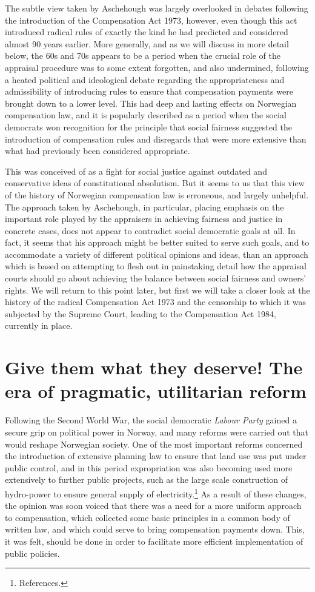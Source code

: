 The subtle view taken by Aschehough was largely overlooked in debates following the introduction of the Compensation Act 1973, however, even though this act introduced radical rules of exactly the kind he had predicted and considered almost 90 years earlier. More generally, and as we will discuss in more detail below, the 60s and 70s appears to be a period when the crucial role of the appraisal procedure was to some extent forgotten, and also undermined, following a heated political and ideological debate regarding the appropriateness and admissibility of introducing rules to ensure that compensation payments were brought down to a lower level. This had deep and lasting effects on Norwegian compensation law, and it is popularly described as a period when the social democrats won recognition for the principle that social fairness suggested the introduction of compensation rules and disregards that were more extensive than what had previously been considered appropriate. 

This was conceived of as a fight for social justice against outdated and conservative ideas of constitutional absolutism. But it seems to us that this view of the history of Norwegian compensation law is erroneous, and largely unhelpful. The approach taken by Aschehough, in particular, placing emphasis on the important role played by the appraisers in achieving fairness and justice in concrete cases, does not appear to contradict social democratic goals at all. In fact, it seems that his approach might be better suited to serve such goals, and to accommodate a variety of different political opinions and ideas, than an approach which is based on attempting to flesh out in painstaking detail how the appraisal courts should go about achieving the balance between social fairness and owners' rights. We will return to this point later, but first we will take a closer look at the history of the radical Compensation Act 1973 and the censorship to which it was subjected by the Supreme Court, leading to the Compensation Act 1984, currently in place.

\section{Give them what they deserve! The era of pragmatic, utilitarian reform}\label{sec:pra}

Following the Second World War, the social democratic \emph{Labour Party} gained a secure grip on political power in Norway, and many reforms were carried out that would reshape Norwegian society. One of the most important reforms concerned the introduction of extensive planning law to ensure that land use was put under public control, and in this period expropriation was also becoming used more extensively to further public projects, such as the large scale construction of hydro-power to ensure general supply of electricity.\footnote{References.} As a result of these changes, the opinion was soon voiced that there was a need for a more uniform approach to compensation, which collected some basic principles in a common body of written law, and which could serve to bring compensation payments down. This, it was felt, should be done in order to facilitate more efficient implementation of public policies. 

